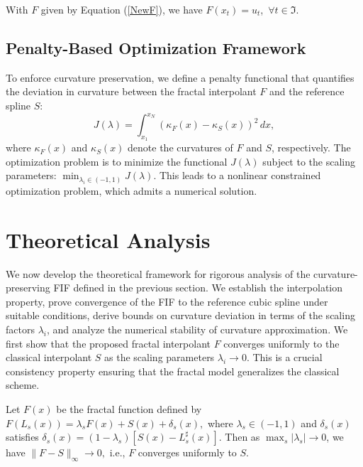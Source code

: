 \documentclass[runningheads]{llncs}
\begin{document}
	\begin{remark}
		With $F$ given by Equation (\ref{NewF}), we have $F(x_t) = u_t$,\ $\forall t \in \Im $.
	\end{remark}
	
	\subsection{Penalty-Based Optimization Framework}
	To enforce curvature preservation, we define a penalty functional that quantifies the deviation in curvature between the fractal interpolant $ F $ and the reference spline $ S $:
	$$
	J(\lambda) = \int_{x_1}^{x_N} \left( \kappa_F(x) - \kappa_S(x) \right)^2 \, dx,
	$$
	where $ \kappa_F(x) $ and $ \kappa_S(x) $ denote the curvatures of $ F $ and $ S $, respectively.
	The optimization problem is to minimize the functional $ J(\lambda) $ subject to the scaling parameters: $
	\min_{\lambda_i \in (-1,1)} J(\lambda).$ This leads to a nonlinear constrained optimization problem, which admits a numerical solution.
	
	\section{Theoretical Analysis}\label{sec4}
	We now develop the theoretical framework for rigorous analysis of the curvature-preserving FIF defined in the previous section. We establish the interpolation property, prove convergence of the FIF to the reference cubic spline under suitable conditions, derive bounds on curvature deviation in terms of the scaling factors $ \lambda_i $, and analyze the numerical stability of curvature approximation. We first show that the proposed fractal interpolant $ F $ converges uniformly to the classical interpolant $ S $ as the scaling parameters $ \lambda_i \to 0 $. This is a crucial consistency property ensuring that the fractal model generalizes the classical scheme.
	\begin{theorem}\label{theorem3}
		Let $ F(x) $ be the fractal function defined by $ F(L_s(x)) = \lambda_s F(x) + S(x) + \delta_s(x),$
		where $ \lambda_s \in (-1,1) $ and $ \delta_s(x) $ satisfies $ \delta_s(x) = (1 - \lambda_s)[S(x) - L_s^\sharp(x)]$. Then as $ \max_s |\lambda_s| \to 0 $, we have $ \|F - S\|_\infty \to 0,$ i.e., $ F $ converges uniformly to $ S $.
	\end{theorem}
	
\end{document}
